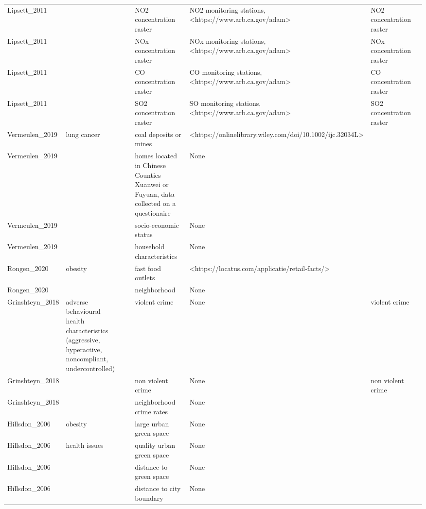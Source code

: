 \begin{tabular}{p{1cm}p{1cm}p{1cm}p{1cm}p{1cm}p{1cm}p{1cm}}
Lipsett\_2011 &  &  & NO2 concentration raster & NO2 monitoring stations, <https://www.arb.ca.gov/adam> & NO2 concentration raster &  \\
Lipsett\_2011 &  &  & NOx concentration raster & NOx monitoring stations, <https://www.arb.ca.gov/adam> & NOx concentration raster &  \\
Lipsett\_2011 &  &  & CO concentration raster & CO monitoring stations, <https://www.arb.ca.gov/adam> & CO concentration raster &  \\
Lipsett\_2011 &  &  & SO2 concentration raster & SO monitoring stations, <https://www.arb.ca.gov/adam> & SO2 concentration raster &  \\
Vermeulen\_2019 & lung cancer &  & coal deposits or mines & <https://onlinelibrary.wiley.com/doi/10.1002/ijc.32034L> &  &  \\
Vermeulen\_2019 &  &  & homes located in Chinese Counties Xuanwei or Fuyuan, data collected on a questionaire & None &  &  \\
Vermeulen\_2019 &  &  & socio-economic status & None &  &  \\
Vermeulen\_2019 &  &  & household characteristics & None &  &  \\
Rongen\_2020 & obesity &  & fast food outlets & <https://locatus.com/applicatie/retail-facts/> &  &  \\
Rongen\_2020 &  &  & neighborhood & None &  &  \\
Grinshteyn\_2018 & adverse behavioural health characteristics (aggressive, hyperactive, noncompliant, undercontrolled) &  & violent crime & None & violent crime &  \\
Grinshteyn\_2018 &  &  & non violent crime & None & non violent crime &  \\
Grinshteyn\_2018 &  &  & neighborhood crime rates & None &  &  \\
Hillsdon\_2006 & obesity &  & large urban green space & None &  &  \\
Hillsdon\_2006 & health issues &  & quality urban green space & None &  &  \\
Hillsdon\_2006 &  &  & distance to green space & None &  &  \\
Hillsdon\_2006 &  &  & distance to city boundary & None &  &  \\
\bottomrule
\end{tabular}
